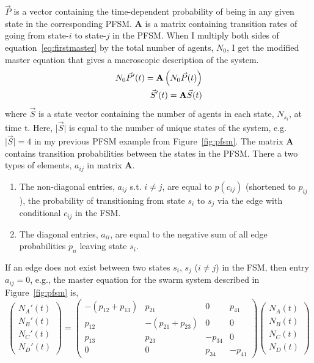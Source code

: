 \documentclass[defaultstyle,12pt]{proposal}
\newcommand{\abs}[1]{\lvert#1\rvert}
\begin{document}
$\vec{P}$ is a vector containing the time-dependent probability of being in any given state in the corresponding PFSM. $\mathbf{A}$ is a matrix containing transition rates of going from state-$i$ to state-$j$ in the PFSM. When I multiply both sides of equation~\eqref{eq:firstmaster} by the total number of agents, $N_0$, I get the modified master equation that gives a macroscopic description of the system.
\begin{align}
N_0 \vec{P}'(t) = \mathbf{A}\left(N_0\vec{P}(t)\right)\notag\\
\vec{S}'(t) = \mathbf{A}\vec{S}(t)\label{eq:master}
\end{align}
where $\vec{S}$ is a state vector containing the number of agents in each state, $N_{s_i}$, at time t. Here, $\abs{\vec{S}}$ is equal to the number of unique states of the system, e.g. $\abs{\vec{S}} = 4$ in my previous PFSM example from Figure~\ref{fig:pfsm}. The matrix $\mathbf{A}$ contains transition probabilities between the states in the PFSM. There a two types of elements, $a_{ij}$ in matrix $\mathbf{A}$.
\begin{enumerate}
\item The non-diagonal entries, $a_{ij}$ s.t. $i\not=j$, are equal to $p(c_{ij})$ (shortened to $p_{ij}$), the probability of transitioning from state $s_i$ to $s_j$ via the edge with conditional $c_{ij}$ in the FSM.
\item The diagonal entries, $a_{ii}$, are equal to the negative sum of all edge probabilities $p_{n}$ leaving state $s_i$.
\end{enumerate} 
If an edge does not exist between two states $s_i$, $s_j$ ($i\not=j$) in the FSM, then entry $a_{ij} = 0$, e.g., the master equation for the swarm system described in Figure~\ref{fig:pfsm} is,
\begin{equation}\label{eq:mastereqns}
\left(
	\begin{array}{c}N_A'(t) \\ N_B'(t) \\ N_C'(t) \\ N_D'(t)\end{array}
\right) =
\left(
	\begin{array}{cccc}
	-(p_{12} + p_{13}) & p_{21} & 0 & p_{41}\\
	p_{12} & -(p_{21} + p_{23}) & 0 & 0\\
	p_{13} & p_{23} & -p_{34} & 0\\
	0 & 0 & p_{34} & -p_{41}
	\end{array}
\right)
\left(\begin{array}{c}N_A(t) \\ N_B(t) \\ N_C(t) \\ N_D(t)\end{array}\right)
\end{equation}
\end{document}
